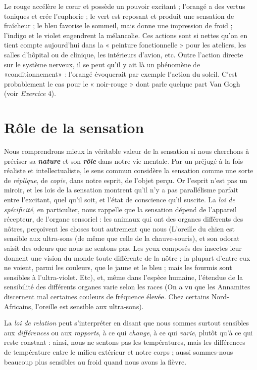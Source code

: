 \vspace{0.24cm}
{\footnotesize 
Le rouge accélère le cœur et possède un pouvoir excitant ; l’orangé a des
vertus toniques et crée l’euphorie ; le vert est reposant et produit une sensation
de fraîcheur ; le bleu favorise le sommeil, mais donne une impression
de froid ; l’indigo et le violet engendrent la mélancolie. Ces actions sont si
nettes qu’on en tient compte aujourd’hui dans la « peinture fonctionnelle »
pour les ateliers, les salles d'hôpital ou de clinique, les intérieurs d’avion, etc.
Outre l’action directe sur le système nerveux, il se peut qu’il y ait là un
phénomène de «conditionnement» : l’orangé évoquerait par exemple
l’action du soleil. C’est probablement le cas pour le « noir-rouge » dont
parle quelque part Van Gogh (voir {\it Exercice} 4).}
\vspace{0.31cm}

\section{Rôle de la sensation}%
Nous comprendrons mieux la véritable
valeur de la sensation si nous cherchons à préciser sa \textbf{\textit {nature}}
et son \textbf{\textit {rôle}} dans notre vie mentale. Par un préjugé à la fois réaliste
et intellectualiste, le sens commun considère la sensation comme une
sorte de {\it réplique}, de {\it copie}, dans notre esprit, de l’objet perçu. Or
l'esprit n’est pas un miroir, et les lois de la sensation montrent qu’il
n’y a pas parallélisme parfait entre l’excitant, quel qu’il soit, et l’état
de conscience qu’il suscite. La {\it loi de spécificité}, en particulier, nous
rappelle que la sensation dépend de l'appareil récepteur, de l'organe
sensoriel : les animaux qui ont des organes différents des nôtres, perçoivent
les choses tout autrement que nous
{\scriptsize (L'oreille du chien est sensible aux ultra-sons (de même que celle de la
chauve-souris), et son odorat saisit des odeurs que nous ne sentons pas. Les yeux composés
des insectes leur donnent une vision du monde toute différente de la nôtre ; la plupart
d’entre eux ne voient, parmi les couleurs, que le jaune et le bleu ; mais les fourmis sont
sensibles à l’ultra-violet. Etc)},
et, même dans l’espèce
humaine, l’étendue de la sensibilité des différents organes varie selon
les races
{\scriptsize (On a vu que les Annamites discernent mal certaines couleurs de fréquence
élevée. Chez certains Nord-Africains, l'oreille est sensible aux ultra-sons)}.

La {\it loi de relation} peut s’interpréter en disant que nous
sommes surtout sensibles aux {\it différences} ou aux {\it rapports}, à ce qui
{\it change}, à ce qui {\it varie}, plutôt qu’à ce qui reste constant : ainsi, nous
ne sentons pas les températures, mais les différences de température
entre le milieu extérieur et notre corps ; aussi sommes-nous beaucoup
plus sensibles au froid quand nous avons la fièvre.

